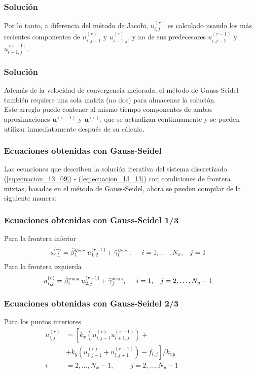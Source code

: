 \begin{frame}
\frametitle{Solución}
Por lo tanto, a diferencia del método de Jacobi, $u_{i,j}^{(r)}$ es calculado usando los más recientes componentes de $u_{i,j-1}^{(r)}$ y $u_{i-1, j}^{(r)}$, y no de sus predecesores $u_{i,j-1}^{(r-1)}$ y $u_{i-1, j}^{(r-1)}$.
\end{frame}
\begin{frame}
\frametitle{Solución}
Además de la velocidad de convergencia mejorada, el método de Gauss-Seidel también requiere una sola matriz (no dos) para almacenar la solución.
\\
\bigskip
Este arreglo puede contener al mismo tiempo componentes de ambas aproximaciones $\mathbf{u}^{(r-1)}$ y $\mathbf{u}^{(r)}$, que se actualizan continuamente y se pueden utilizar inmediatamente después de su cálculo.
\end{frame}
\begin{frame}
\frametitle{Ecuaciones obtenidas con Gauss-Seidel}
Las ecuaciones que describen la solución iterativa del sistema discretizado (\ref{eq:ecuacion_13_09}) -  (\ref{eq:ecuacion_13_13}) con condiciones de frontera mixtas, basadas en el método de Gauss-Seidel, ahora se pueden compilar de la siguiente manera:
\end{frame}
\begin{frame}
\frametitle{Ecuaciones obtenidas con Gauss-Seidel 1/3}
Para la frontera inferior
\begin{equation}
u_{i, 1}^{(r)} = \bar{\beta}_{i}^{y {\text{\tiny{min}}}} \: u_{1,2}^{(r-1)} + \bar{\gamma}_{i}^{y {\text{\tiny{min}}}}, \hspace{0.5cm} i = 1, \ldots, N_{x}, \hspace{0.3cm} j = 1
\label{eq:ecuacion_13_24}
\end{equation}
\pause
Para la frontera izquierda
\begin{equation}
u_{i, j}^{(r)} = \bar{\beta}_{i}^{x {\text{\tiny{min}}}} \: u_{2, j}^{(r-1)} + \bar{\gamma}_{j}^{x {\text{\tiny{min}}}}, \hspace{0.5cm} i = 1, \hspace{0.3cm} j = 2, \ldots, N_{y} - 1
\label{eq:ecuacion_13_25}
\end{equation}
\end{frame}
\begin{frame}
\frametitle{Ecuaciones obtenidas con Gauss-Seidel 2/3}
Para los puntos interiores
\begin{equation}
\begin{aligned}
u_{i,j}^{(r)} &= \left[ k_{x} \left( u_{i, j-1}^{(r)} u_{i+1, j}^{(r-1)} \right) + \right. \\
&+ \left. k_{y} \left( u_{i, j-1}^{(r)} + u_{i, j+1}^{(r-1)} \right) - f_{i,j} \right] / k_{xy} \\
i &= 2, \ldots, N_{x} - 1, \hspace{1cm} j = 2, \ldots, N_{y} - 1 \hspace{2cm}
\end{aligned}
\label{eq:ecuacion_13_26}
\end{equation}    
\end{frame}
